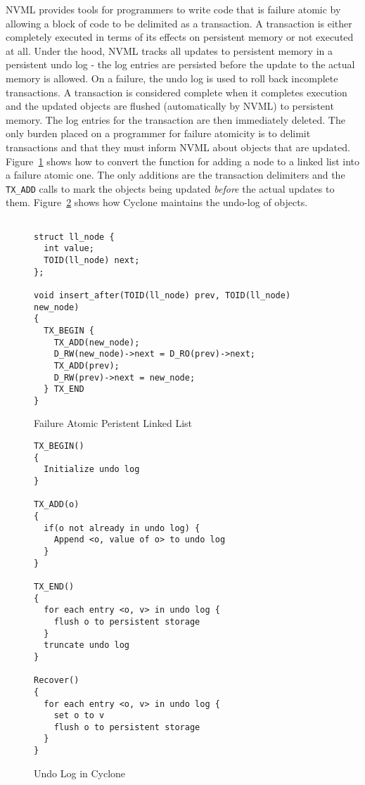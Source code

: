 \documentclass[twocolumn]{article}
\begin{document}
NVML provides tools for programmers to write code that is failure
atomic by allowing a block of code to be delimited as a transaction. A
transaction is either completely executed in terms of its effects on
persistent memory or not executed at all. Under the hood, NVML tracks all
updates to persistent memory in a persistent undo log - the log entries are
persisted before the update to the actual memory is allowed. On a failure, the
undo log is used to roll back incomplete transactions. A transaction is
considered complete when it completes execution and the updated objects are
flushed (automatically by NVML) to persistent memory. The log entries for the
transaction are then immediately deleted. The only burden placed on a programmer
for failure atomicity is to delimit transactions and that they must inform NVML
about objects that are updated. Figure~\ref{fig:example_fatomic} shows how to
convert the function for adding a node to a linked list into a failure atomic
one. The only additions are the transaction delimiters and the {\tt TX\_ADD}
calls to mark the objects being updated \emph{before} the actual updates to
them. Figure~\ref{fig:undo_log} shows how Cyclone maintains the undo-log of
objects.

\begin{figure}
{ \scriptsize
\begin{verbatim}

struct ll_node {
  int value;
  TOID(ll_node) next;
};

void insert_after(TOID(ll_node) prev, TOID(ll_node) new_node)
{
  TX_BEGIN {
    TX_ADD(new_node);
    D_RW(new_node)->next = D_RO(prev)->next;
    TX_ADD(prev);
    D_RW(prev)->next = new_node;
  } TX_END
}

\end{verbatim}
}
\caption{Failure Atomic Peristent Linked List}
\label{fig:example_fatomic}
\end{figure}

\begin{figure}
{ \scriptsize
\begin{verbatim}
TX_BEGIN()
{
  Initialize undo log
}

TX_ADD(o)
{
  if(o not already in undo log) {
    Append <o, value of o> to undo log
  }
}

TX_END()
{
  for each entry <o, v> in undo log {
    flush o to persistent storage
  }
  truncate undo log
}

Recover()
{
  for each entry <o, v> in undo log {
    set o to v
    flush o to persistent storage
  }   
}

\end{verbatim}
}
\caption{Undo Log in Cyclone}
\label{fig:undo_log}
\end{figure}
\end{document}
